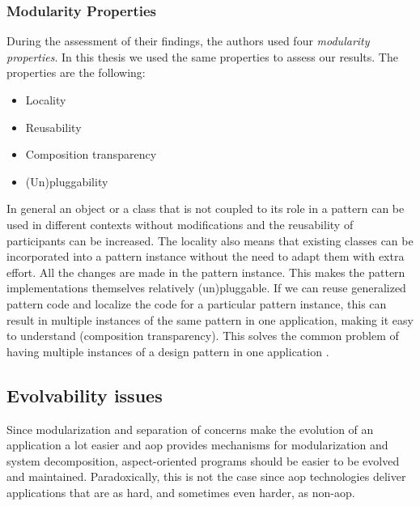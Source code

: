 \subsubsection{Modularity Properties}\label{BG Modularity Properties}
During the assessment of their findings, the authors used four \textit{modularity properties}.
In this thesis we used the same properties to assess our results.
The properties are the following:

\begin{itemize}
	\item Locality
	\item Reusability
	\item Composition transparency
	\item (Un)pluggability
\end{itemize}

In general an object or a class that is not coupled to its role in a pattern can be used in different contexts without modifications and the reusability of participants can be increased. 
The locality also means that existing classes can be incorporated into a pattern instance without the need to adapt them with extra effort. All the changes are made in the pattern instance. 
This makes the pattern implementations themselves relatively (un)pluggable. 
If we can reuse generalized pattern code and localize the code for a particular pattern instance, this can result in multiple instances of the same pattern in one application, making it easy to understand (composition transparency). 
This solves the common problem of having multiple instances of a design pattern in one application \cite{hannemann2002design}.

\subsection{Evolvability issues}\label{Aspect Oriented Programming Evolvability}
Since modularization and separation of concerns make the evolution of an application a lot easier and \ac{aop} provides mechanisms for modularization and system decomposition, aspect-oriented programs should be easier to be evolved and maintained.
Paradoxically, this is not the case \cite{tourwe2003existence} since \ac{aop} technologies deliver applications that are as hard, and sometimes even harder, as non-\ac{aop}.

